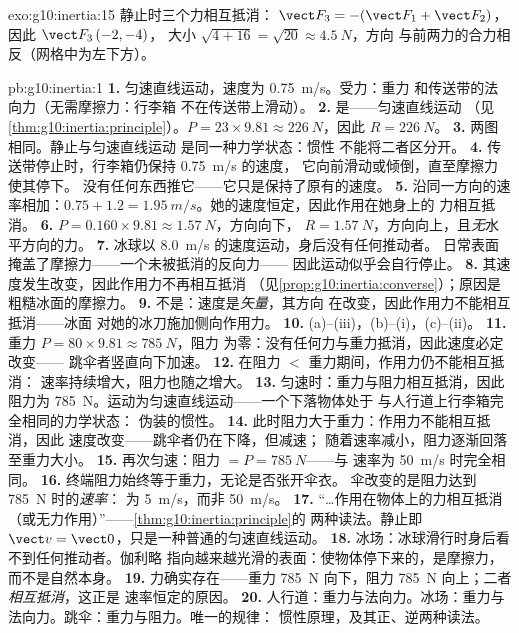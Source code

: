\begin{solution}{exo:g10:inertia:15}
静止时三个力相互抵消：
$\vect F_3 = -(\vect F_1 + \vect F_2)$，因此 $\vect F_3\,(-2, -4)$，
大小 $\sqrt{4 + 16} = \sqrt{20} \approx \qty{4.5}{N}$，方向
与前两力的合力相反（网格中为左下方）。
\end{solution}

\begin{solution}{pb:g10:inertia:1}
\textbf{1.} 匀速直线运动，速度为 \qty{0.75}{m/s}。受力：重力
和传送带的法向力（无需摩擦力：行李箱
不在传送带上滑动）。
\textbf{2.} 是——匀速直线运动
（见\cref{thm:g10:inertia:principle}）。$P = 23 \times 9.81 \approx
\qty{226}{N}$，因此 $R = \qty{226}{N}$。
\textbf{3.} 两图相同。静止与匀速直线运动
是同一种力学状态：惯性
不能将二者区分开。
\textbf{4.} 传送带停止时，行李箱仍保持 \qty{0.75}{m/s} 的速度，
它向前滑动或倾倒，直至摩擦力使其停下。
没有任何东西推它——它只是保持了原有的速度。
\textbf{5.} 沿同一方向的速率相加：$0.75 + 1.2 =
\qty{1.95}{m/s}$。她的速度恒定，因此作用在她身上的
力相互抵消。
\textbf{6.} $P = 0.160 \times 9.81 \approx \qty{1.57}{N}$，方向向下，
$R = \qty{1.57}{N}$，方向向上，且\emph{无}水平方向的力。
\textbf{7.} 冰球以 \qty{8.0}{m/s} 的速度运动，身后没有任何推动者。
日常表面掩盖了摩擦力——一个未被抵消的反向力——
因此运动似乎会自行停止。
\textbf{8.} 其速度发生改变，因此作用力不再相互抵消
（见\cref{prop:g10:inertia:converse}）；原因是
粗糙冰面的摩擦力。
\textbf{9.} 不是：速度是\emph{矢量}，其方向
在改变，因此作用力不能相互抵消——冰面
对她的冰刀施加侧向作用力。
\textbf{10.} (a)--(iii)，(b)--(i)，(c)--(ii)。
\textbf{11.} 重力 $P = 80 \times 9.81 \approx \qty{785}{N}$，阻力
为零：没有任何力与重力抵消，因此速度必定改变——
跳伞者竖直向下加速。
\textbf{12.} 在阻力 $<$ 重力期间，作用力仍不能相互抵消：
速率持续增大，阻力也随之增大。
\textbf{13.} 匀速时：重力与阻力相互抵消，因此阻力为
\qty{785}{N}。运动为匀速直线运动——一个下落物体处于
与人行道上行李箱完全相同的力学状态：
伪装的惯性。
\textbf{14.} 此时阻力大于重力：作用力不能相互抵消，因此
速度改变——跳伞者仍在下降，但减速；
随着速率减小，阻力逐渐回落至重力大小。
\textbf{15.} 再次匀速：阻力 $= P = \qty{785}{N}$——与
速率为 \qty{50}{m/s} 时完全相同。
\textbf{16.} 终端阻力始终等于重力，无论是否张开伞衣。
伞改变的是阻力达到 \qty{785}{N} 时的\emph{速率}：
为 \qty{5}{m/s}，而非 \qty{50}{m/s}。
\textbf{17.} “\dots 作用在物体上的力相互抵消
（或无力作用）”——\cref{thm:g10:inertia:principle}的
两种读法。静止即 $\vect v = \vect 0$，只是一种普通的匀速直线运动。
\textbf{18.} 冰场：冰球滑行时身后看不到任何推动者。伽利略
指向越来越光滑的表面：使物体停下来的，是摩擦力，
而不是自然本身。
\textbf{19.} 力确实存在——重力 \qty{785}{N} 向下，阻力
\qty{785}{N} 向上；二者\emph{相互抵消}，这正是
速率恒定的原因。
\textbf{20.} 人行道：重力与法向力。冰场：重力与
法向力。跳伞：重力与阻力。唯一的规律：
惯性原理，及其正、逆两种读法。
\end{solution}
